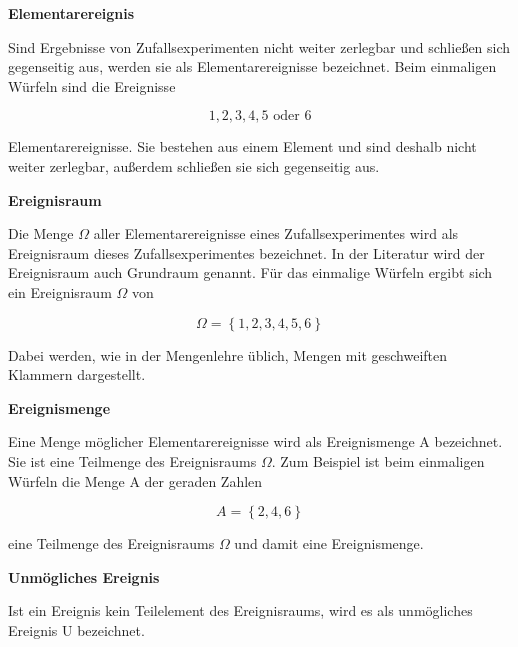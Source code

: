 {\selectfont
\noindent\textbf{Elementarereignis}} \smallskip

\noindent Sind Ergebnisse von Zufallsexperimenten nicht weiter zerlegbar und schlie{\ss}en sich gegenseitig aus, werden sie als Elementarereignisse bezeichnet. Beim einmaligen W\"{u}rfeln sind die Ereignisse 

\begin{equation}\label{eq:twotwo}
1, 2, 3, 4, 5 \text{ oder } 6
\end{equation}

\noindent Elementarereignisse. Sie bestehen aus einem Element und sind deshalb nicht weiter zerlegbar, au{\ss}erdem schlie{\ss}en sie sich gegenseitig aus.

\clearpage

{\selectfont
\noindent\textbf{Ereignisraum}} \smallskip

\noindent  Die Menge $\Omega$ aller Elementarereignisse eines Zufallsexperimentes wird als Ereignisraum dieses Zufallsexperimentes bezeichnet. In der Literatur wird der Ereignisraum auch Grundraum genannt. F\"{u}r das einmalige W\"{u}rfeln ergibt sich ein Ereignisraum $\Omega$ von

\begin{equation}\label{eq:twothree}
\Omega = \left\{1, 2, 3, 4, 5, 6\right\}
\end{equation}

\noindent Dabei werden, wie in der Mengenlehre \"{u}blich, Mengen mit geschweiften Klammern dargestellt. \bigskip

{\selectfont
\noindent\textbf{Ereignismenge}} \smallskip

\noindent Eine Menge m\"{o}glicher Elementarereignisse wird als Ereignismenge A bezeichnet. Sie ist eine Teilmenge des Ereignisraums $\Omega$. Zum Beispiel ist beim einmaligen W\"{u}rfeln die Menge A der geraden Zahlen 

\begin{equation}\label{eq:twofour}
A = \left\{2, 4, 6\right\}
\end{equation}

\noindent eine Teilmenge des Ereignisraums $\Omega$ und damit eine Ereignismenge.\bigskip

{\selectfont
\noindent\textbf{Unm\"{o}gliches Ereignis}} \smallskip

\noindent Ist ein Ereignis kein Teilelement des Ereignisraums, wird es als unm\"{o}gliches Ereignis U bezeichnet. 

